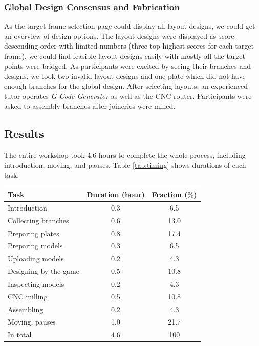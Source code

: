 \subsubsection*{Global Design Consensus and Fabrication} 
As the target frame selection page could display all layout designs, we could get an overview of design options.
The layout designs were displayed as score descending order with limited numbers (three top highest scores for each target frame), we could find feasible layout designs easily with mostly all the target points were bridged.
As participants were excited by seeing their branches and designs, we took two invalid layout designs and one plate which did not have enough branches for the global design.
%
After selecting layouts, an experienced tutor operates \textit{G-Code Generator} as well as the CNC router.
Participants were asked to assembly branches after joineries were milled.

\subsection{Results}


The entire workshop took 4.6 hours to complete the whole process, including introduction, moving, and pauses.
Table \ref{tab:timing} shows durations of each task.

\begin{center}
  \begin{tabulary}{\columnwidth}{ |l||C|C| }
    \hline
    Task & Duration (hour) & Fraction ($\%$) \\
    \hline
    Introduction                  & 0.3 & 6.5  \\
    Collecting branches           & 0.6 & 13.0  \\
    Preparing plates              & 0.8 & 17.4  \\
    Preparing models              & 0.3 & 6.5  \\
    Uploading models              & 0.2 & 4.3 \\
    Designing by the game         & 0.5 & 10.8 \\
    Inspecting models             & 0.2 & 4.3 \\
    CNC milling                   & 0.5 & 10.8\\
    Assembling                    & 0.2 & 4.3 \\
    Moving, pauses               & 1.0 & 21.7 \\
    \hline
    In total                      & 4.6   & 100 \\
    \hline
  \end{tabulary}
  \label{tab:timing}
\end{center}



